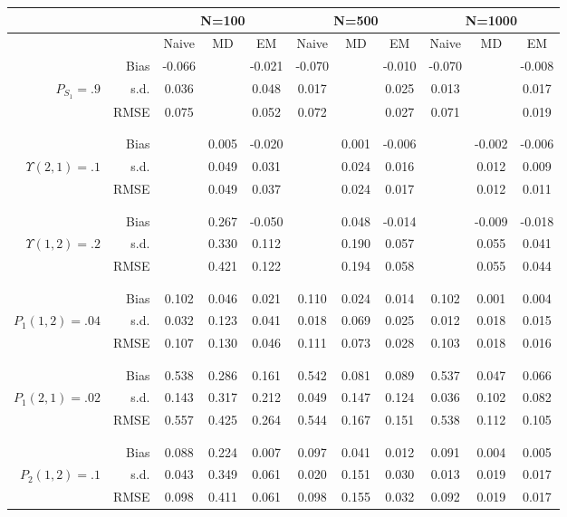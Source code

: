 \begin{tabular}{rr@{\hskip .3in}ccc@{\hskip .4in}ccc@{\hskip .4in}ccc}
\hline
& &  \multicolumn{3}{c}{N=100}&\multicolumn{3}{c}{N=500}&\multicolumn{3}{c}{N=1000} \\
\hline
&   &Naive & MD & EM &Naive & MD & EM &Naive & MD & EM \\
\hline
&Bias & -0.066&&-0.021&-0.070&&-0.010&-0.070&&-0.008 \\
$ P_{S_{1}}=.9 $& s.d. & 0.036&&0.048&0.017&&0.025&0.013&&0.017 \\
&RMSE & 0.075&&0.052&0.072&&0.027&0.071&&0.019 \\
\\\\&Bias & &0.005&-0.020&&0.001&-0.006&&-0.002&-0.006 \\
$ \Upsilon(2,1)=.1 $& s.d. & &0.049&0.031&&0.024&0.016&&0.012&0.009 \\
&RMSE & &0.049&0.037&&0.024&0.017&&0.012&0.011 \\
\\\\&Bias & &0.267&-0.050&&0.048&-0.014&&-0.009&-0.018 \\
$ \Upsilon(1,2)=.2 $& s.d. & &0.330&0.112&&0.190&0.057&&0.055&0.041 \\
&RMSE & &0.421&0.122&&0.194&0.058&&0.055&0.044 \\
\\\\&Bias & 0.102&0.046&0.021&0.110&0.024&0.014&0.102&0.001&0.004 \\
$ P_{1}(1,2)=.04 $& s.d. & 0.032&0.123&0.041&0.018&0.069&0.025&0.012&0.018&0.015 \\
&RMSE & 0.107&0.130&0.046&0.111&0.073&0.028&0.103&0.018&0.016 \\
\\\\&Bias & 0.538&0.286&0.161&0.542&0.081&0.089&0.537&0.047&0.066 \\
$ P_{1}(2,1)=.02 $& s.d. & 0.143&0.317&0.212&0.049&0.147&0.124&0.036&0.102&0.082 \\
&RMSE & 0.557&0.425&0.264&0.544&0.167&0.151&0.538&0.112&0.105 \\
\\\\&Bias & 0.088&0.224&0.007&0.097&0.041&0.012&0.091&0.004&0.005 \\
$ P_{2}(1,2)=.1 $& s.d. & 0.043&0.349&0.061&0.020&0.151&0.030&0.013&0.019&0.017 \\
&RMSE & 0.098&0.411&0.061&0.098&0.155&0.032&0.092&0.019&0.017 \\

\end{tabular}
